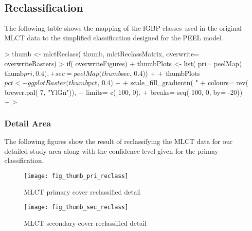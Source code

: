 \subsection{Reclassification}
\label{sec:mlct-reclass}

The following table shows the mapping of the IGBP classes used in the
original MLCT data to the simplified classification designed for the
PEEL model.



\begin{Schunk}
\begin{Sinput}
> thumb <- mlctReclass( thumb, mlctReclassMatrix, overwrite= overwriteRasters)
> if( overwriteFigures) {
+   thumbPlots <- list( pri= peelMap( thumb$pri, 0.4),
+                      sec= peelMap( thumb$sec, 0.4))
+ 
+   thumbPlots$pct <- ggplotRaster( thumb$pct, 0.4) + 
+     scale_fill_gradientn( "% confidence", 
+                          colours= rev( brewer.pal( 7, "YlGn")), 
+                          limits= c( 100, 0),
+                          breaks= seq( 100, 0, by= -20))
+ }
> 
\end{Sinput}
\end{Schunk}

\subsubsection{Detail Area}
\label{sec:reclass-detail-area}


The following figures show the result of reclassifying the MLCT data
for our detailed study area along with the confidence level given for
the primay classification.

\begin{figure} 
\begin{center}
  
\begin{Schunk}
\end{Schunk}

\texttt{[image: fig\_thumb\_pri\_reclass]}
\end{center} 
\caption{MLCT primary cover reclassified detail} 
\label{fig:thumb_pri_reclass} 
\end{figure} 


\begin{figure} 
\begin{center}
  
\begin{Schunk}
\end{Schunk}

\texttt{[image: fig\_thumb\_sec\_reclass]}
\end{center} 
\caption{MLCT secondary cover reclassified detail} 
\label{fig:thumb_sec_reclass} 
\end{figure} 


